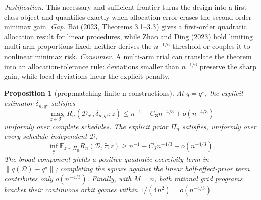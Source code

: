 \documentclass{article}
\newtheorem{proposition}{Proposition}
\begin{document}
\par\smallskip\noindent \textit{Justification.} This necessary-and-sufficient frontier turns the design into a first-class object and quantifies exactly when allocation error erases the second-order minimax gain. \textit{Gap.} Bai (2023, Theorems 3.1--3.3) gives a first-order quadratic allocation result for linear procedures, while Zhao and Ding (2023) hold limiting multi-arm proportions fixed; neither derives the \(n^{-1/6}\) threshold or couples it to nonlinear minimax risk. \textit{Consumer.} A multi-arm trial can translate the theorem into an allocation-tolerance rule: deviations smaller than \(n^{-1/6}\) preserve the sharp gain, while local deviations incur the explicit penalty.

\begin{proposition}[prop:matching-finite-n-constructions]\label{prop:matching-finite-n-constructions}
At \(q=q^\star\), the explicit estimator \(\delta_{n,q^\star}\) satisfies \[\max_{z\in\mathcal T^n}R_n(\mathcal D_{q^\star},\delta_{n,q^\star};z)\le n^{-1}-C_3n^{-4/3}+o(n^{-4/3})\] uniformly over complete schedules. The explicit prior \(\Pi_n\) satisfies, uniformly over every schedule-independent \(\mathcal D\), \[\inf_{\widehat\tau}\mathbb E_{z\sim\Pi_n}R_n(\mathcal D,\widehat\tau;z)\ge n^{-1}-C_3n^{-4/3}+o(n^{-4/3}).\] The broad component yields a positive quadratic coercivity term in \(\|\bar q(\mathcal D)-q^\star\|\); completing the square against the linear half-effect-prior term contributes only \(o(n^{-4/3})\). Finally, with \(M=n\), both rational grid programs bracket their continuous orbit games within \(1/(4n^2)=o(n^{-4/3})\).
\end{proposition}
\end{document}
